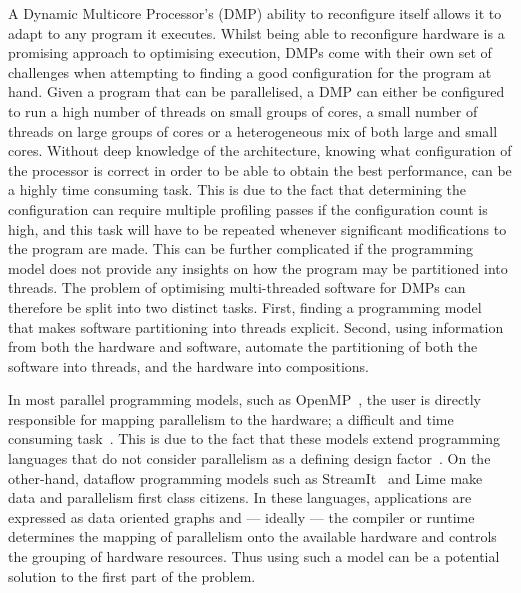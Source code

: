 A Dynamic Multicore Processor's (DMP) ability to reconfigure itself allows it to adapt to any program it executes.
Whilst being able to reconfigure hardware is a promising approach to optimising execution, DMPs come with their own set of challenges when attempting to finding a good configuration for the program at hand.
Given a program that can be parallelised, a DMP can either be configured to run a high number of threads on small groups of cores, a small number of threads on large groups of cores or a heterogeneous mix of both large and small cores.
Without deep knowledge of the architecture, knowing what configuration of the processor is correct in order to be able to obtain the best performance, can be a highly time consuming task.
This is due to the fact that determining the configuration can require multiple profiling passes if the configuration count is high, and this task will have to be repeated whenever significant modifications to the program are made.
This can be further complicated if the programming model does not provide any insights on how the program may be partitioned into threads.
The problem of optimising multi-threaded software for DMPs can therefore be split into two distinct tasks.
First, finding a programming model that makes software partitioning into threads explicit.
Second, using information from both the hardware and software, automate the partitioning of both the software into threads, and the hardware into compositions.

In most parallel programming models, such as OpenMP~\cite{openmp}, the user is directly responsible for mapping parallelism to the hardware; a difficult and time consuming task~\cite{prabhu2011LanguagePar}.
This is due to the fact that these models extend programming languages that do not consider parallelism as a defining design factor~\cite{pingaliTao2011}.
On the other-hand, dataflow programming models such as StreamIt~\cite{theis2002streamit} and Lime \cite{auerbach2012lime} make data and parallelism first class citizens.
In these languages, applications are expressed as data oriented graphs and --- ideally --- the compiler or runtime determines the mapping of parallelism onto the available hardware and controls the grouping of hardware resources.
Thus using such a model can be a potential solution to the first part of the problem.

